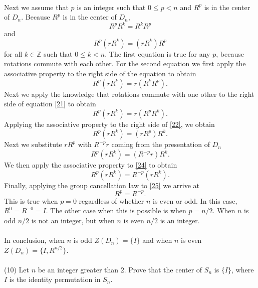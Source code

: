 \documentclass[11pt,a4paper]{article}
\begin{document}
~\\
Next we assume that $p$ is an integer such that $0 \leq p < n$ and $R^p$ is in the center of $D_n$. Because $R^p$ is in the center of $D_n$,
\[R^pR^k = R^kR^p\]
and
\[R^p(rR^k) = (rR^k)R^p\]
for all $k\in \mathbb{Z}$ such that $0 \leq k < n$. The first equation is true for any $p$, because rotations commute with each other. For the second equation we first apply the associative property to the right side of the equation to obtain
\begin{equation}\label{21}
R^p(rR^k) = r(R^kR^p).
\end{equation}
Next we apply the knowledge that rotations commute with one other to the right side of equation \eqref{21} to obtain
\begin{equation}\label{22}
R^p(rR^k) = r(R^pR^k).
\end{equation}
Applying the associative property to the right side of \eqref{22}, we obtain
\begin{equation}\label{23}
R^p(rR^k) = (rR^p)R^k.
\end{equation}
Next we substitute $rR^p$ with $R^{-p}r$ coming from the presentation of $D_n$
\begin{equation}\label{24}
R^p(rR^k) = (R^{-p}r)R^k.
\end{equation}
We then apply the associative property to \eqref{24} to obtain
\begin{equation}\label{25}
R^p(rR^k) = R^{-p}(rR^k).
\end{equation}
Finally, applying the group cancellation law to \eqref{25} we arrive at
\[R^p = R^{-p}.\]
This is true when $p = 0$ regardless of whether $n$ is even or odd. In this case, $R^0 = R^{-0} = I$. The other case when this is possible is when $p = n/2$. When $n$ is odd $n/2$ is not an integer, but when $n$ is even $n/2$ is an integer.\\
~\\
In conclusion, when $n$ is odd $Z(D_n) = \{I \}$ and when $n$ is even $Z(D_n) = \{I, R^{n/2}\}$.\\
~\\
(10) Let $n$ be an integer greater than $2$. Prove that the center of $S_n$ is $\{I \}$, where $I$ is the identity permutation in $S_n$.\\
\end{document}
